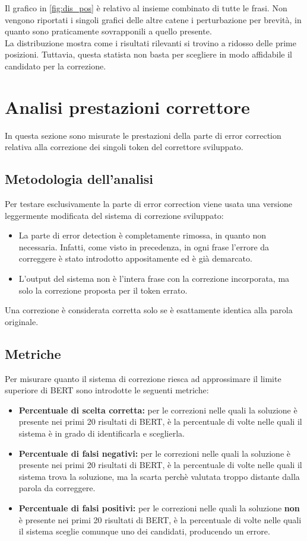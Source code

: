 \documentclass[12pt]{article}
\begin{document}
Il grafico in \autoref{fig:dis_pos} è relativo al insieme combinato di tutte le frasi. Non vengono riportati i singoli grafici delle altre catene i perturbazione per brevità, in quanto sono praticamente sovrapponili a quello presente.\\
La distribuzione mostra come i risultati rilevanti si trovino a ridosso delle prime posizioni. Tuttavia, questa statista non basta per scegliere in modo affidabile il candidato per la correzione.


\section{Analisi prestazioni correttore}
In questa sezione sono misurate le prestazioni della parte di error correction relativa alla correzione dei singoli token del correttore sviluppato.

\subsection{Metodologia dell'analisi}
Per testare esclusivamente la parte di error correction viene usata una versione leggermente modificata del sistema di correzione sviluppato:
\begin{itemize}
\item La parte di error detection è completamente rimossa, in quanto non necessaria. Infatti, come visto in precedenza, in ogni frase l'errore da correggere è stato introdotto appositamente ed è già demarcato.
\item L'output del sistema non è l'intera frase con la correzione incorporata, ma solo la correzione proposta per il token errato.
\end{itemize}

Una correzione è considerata corretta solo se è esattamente identica alla parola originale.

\subsection{Metriche}
Per misurare quanto il sistema di correzione riesca ad approssimare il limite superiore di BERT sono introdotte le seguenti metriche:
\begin{itemize}
\item \textbf{Percentuale di scelta corretta:} per le correzioni nelle quali la soluzione è presente nei primi 20 risultati di BERT, è la percentuale di volte nelle quali il sistema è in grado di identificarla e sceglierla.
\item \textbf{Percentuale di falsi negativi:} per le correzioni nelle quali la soluzione è presente nei primi 20 risultati di BERT, è la percentuale di volte nelle quali il sistema trova la soluzione, ma la scarta perchè valutata troppo distante dalla parola da correggere.
\item \textbf{Percentuale di falsi positivi:} per le correzioni nelle quali la soluzione \textbf{non} è presente nei primi 20 risultati di BERT, è la percentuale di volte nelle quali il sistema sceglie comunque uno dei candidati, producendo un errore.
\end{itemize}
\end{document}
